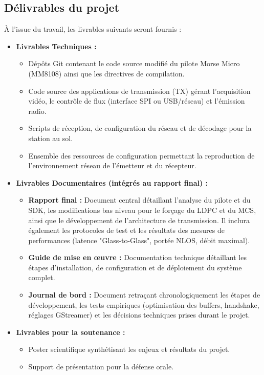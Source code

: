\subsection{Délivrables du projet}
À l'issue du travail, les livrables suivants seront fournis :

\begin{itemize}
    \item \textbf{Livrables Techniques :}
    \begin{itemize}
        \item Dépôts Git contenant le code source modifié du pilote Morse Micro (MM8108) ainsi que les directives de compilation.
        \item Code source des applications de transmission (TX) gérant l'acquisition vidéo, le contrôle de flux (interface SPI ou USB/réseau) et l'émission radio.
        \item Scripts de réception, de configuration du réseau et de décodage pour la station au sol.
        \item Ensemble des ressources de configuration permettant la reproduction de l'environnement réseau de l'émetteur et du récepteur.
    \end{itemize}
    
    \item \textbf{Livrables Documentaires (intégrés au rapport final) :}
    \begin{itemize}
        \item \textbf{Rapport final :} Document central détaillant l'analyse du pilote et du SDK, les modifications bas niveau pour le forçage du LDPC et du MCS, ainsi que le développement de l'architecture de transmission. 
        Il inclura également les protocoles de test et les résultats des mesures de performances (latence "Glass-to-Glass", portée NLOS, débit maximal).
        \item \textbf{Guide de mise en œuvre :} Documentation technique détaillant les étapes d'installation, de configuration et de déploiement du système complet.
        \item \textbf{Journal de bord :} Document retraçant chronologiquement les étapes de développement, les tests empiriques (optimisation des buffers, handshake, réglages GStreamer) et les décisions techniques prises durant le projet.
    \end{itemize}
    
    \item \textbf{Livrables pour la soutenance :}
    \begin{itemize}
        \item Poster scientifique synthétisant les enjeux et résultats du projet.
        \item Support de présentation pour la défense orale.
    \end{itemize}
\end{itemize}